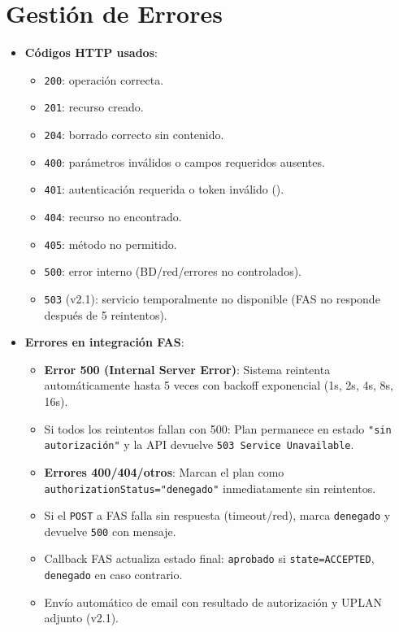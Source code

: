 \documentclass[12pt,a4paper]{article}
\newcommand{\icdendpoint}[1]{\begingroup\small\path{#1}\endgroup}
\begin{document}
\section{Gestión de Errores}
\begin{itemize}
    \item \textbf{Códigos HTTP usados}:
    \begin{itemize}
        \item \texttt{200}: operación correcta.
        \item \texttt{201}: recurso creado.
        \item \texttt{204}: borrado correcto sin contenido.
        \item \texttt{400}: parámetros inválidos o campos requeridos ausentes.
        \item \texttt{401}: autenticación requerida o token inválido (\icdendpoint{/api/user}).
        \item \texttt{404}: recurso no encontrado.
        \item \texttt{405}: método no permitido.
        \item \texttt{500}: error interno (BD/red/errores no controlados).
        \item \texttt{503} (v2.1): servicio temporalmente no disponible (FAS no responde después de 5 reintentos).
    \end{itemize}
    \item \textbf{Errores en integración FAS}:
    \begin{itemize}
        \item \textbf{Error 500 (Internal Server Error)}: Sistema reintenta automáticamente hasta 5 veces con backoff exponencial (1s, 2s, 4s, 8s, 16s).
        \item Si todos los reintentos fallan con 500: Plan permanece en estado \texttt{"sin autorización"} y la API devuelve \texttt{503 Service Unavailable}.
        \item \textbf{Errores 400/404/otros}: Marcan el plan como \texttt{authorizationStatus="denegado"} inmediatamente sin reintentos.
        \item Si el \texttt{POST} a FAS falla sin respuesta (timeout/red), marca \texttt{denegado} y devuelve \texttt{500} con mensaje.
        \item Callback FAS actualiza estado final: \texttt{aprobado} si \texttt{state=ACCEPTED}, \texttt{denegado} en caso contrario.
        \item Envío automático de email con resultado de autorización y UPLAN adjunto (v2.1).

\end{itemize}
\end{itemize}
\end{document}
